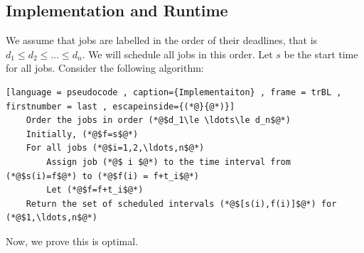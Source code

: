 \documentclass[a4paper]{article}
\theoremstyle{plain}
\theoremstyle{definition}
\theoremstyle{remark}
\begin{document}
	\subsection{Implementation and Runtime}
	We assume that jobs are labelled in the order of their deadlines, that is $d_1\le d_2\le \ldots\le d_n$. We will schedule all jobs in this order. Let $s$ be the start time for all jobs. Consider the following algorithm:
	 \begin{lstlisting}[language = pseudocode , caption={Implementaiton} , frame = trBL , firstnumber = last , escapeinside={(*@}{@*)}]
	Order the jobs in order (*@$d_1\le \ldots\le d_n$@*)
	Initially, (*@$f=s$@*)
	For all jobs (*@$i=1,2,\ldots,n$@*)
		Assign job (*@$ i $@*) to the time interval from (*@$s(i)=f$@*) to (*@$f(i) = f+t_i$@*)
		Let (*@$f=f+t_i$@*)
	Return the set of scheduled intervals (*@$[s(i),f(i)]$@*) for (*@$1,\ldots,n$@*)
	\end{lstlisting}
	Now, we prove this is optimal.
\end{document}
